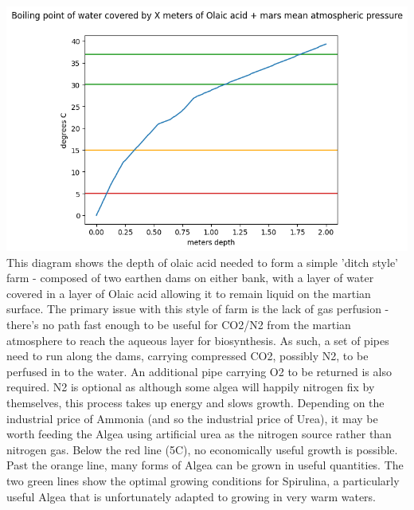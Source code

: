 \documentclass[10pt]{article}
\begin{document}
\includegraphics{fig_bp.png}
This diagram shows the depth of olaic acid needed to form a simple 'ditch style' farm - composed of two earthen dams on either bank, with a layer of water covered in a layer of Olaic acid allowing it to remain liquid on the martian surface. The primary issue with this style of farm is the lack of gas perfusion - there's no path fast enough to be useful for CO2/N2 from the martian atmosphere to reach the aqueous layer for biosynthesis. As such, a set of pipes need to run along the dams, carrying compressed CO2, possibly N2, to be perfused in to the water. An additional pipe carrying O2 to be returned is also required. N2 is optional as although some algea will happily nitrogen fix by themselves, this process takes up energy and slows growth. Depending on the industrial price of Ammonia (and so the industrial price of Urea), it may be worth feeding the Algea using artificial urea as the nitrogen source rather than nitrogen gas. Below the red line (5C), no economically useful growth is possible. Past the orange line, many forms of Algea can be grown in useful quantities. The two green lines show the optimal growing conditions for Spirulina, a particularly useful Algea that is unfortunately adapted to growing in very warm waters.
\end{document}
